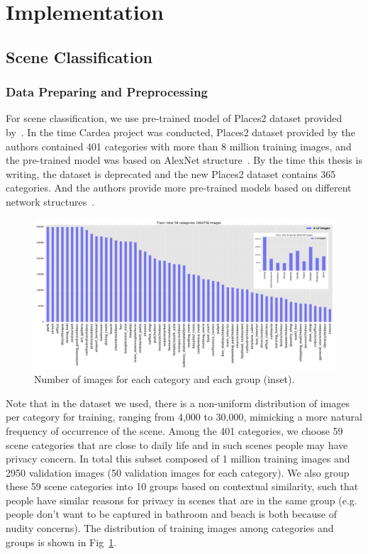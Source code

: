 \section{Implementation}

\subsection{Scene Classification}

\subsubsection{Data Preparing and Preprocessing}

For scene classification, we use pre-trained model of Places2 dataset provided by~\cite{links:places2mit}. In the time Cardea project was conducted, Places2 dataset provided by the authors contained 401 categories with more than 8 million training images, and the pre-trained model was based on AlexNet structure~\cite{krizhevsky2012imagenet}. By the time this thesis is writing, the dataset is deprecated and the new Places2 dataset contains 365 categories. And the authors provide more pre-trained models based on different network structures~\cite{links:places2pre}.

\begin{figure}[!htbp]
    \centering
    \includegraphics[width=1.0\textwidth]{figure/ch4-numdist.pdf}
    \caption{Number of images for each category and each group (inset).}
    \label{fig:ch4-scenenumdist}
\end{figure}

Note that in the dataset we used, there is a non-uniform distribution of images per category for training, ranging from 4,000 to 30,000, mimicking a more natural frequency of occurrence of the scene. Among the 401 categories, we choose 59 scene categories that are close to daily life and in such scenes people may have privacy concern. In total this subset composed of 1 million training images and 2950 validation images (50 validation images for each category). We also group these 59 scene categories into 10 groups based on contextual similarity, such that people have similar reasons for privacy in scenes that are in the same group (e.g. people don't want to be captured in bathroom and beach is both because of nudity concerns). The distribution of training images among categories and groups is shown in Fig~\ref{fig:ch4-scenenumdist}.

